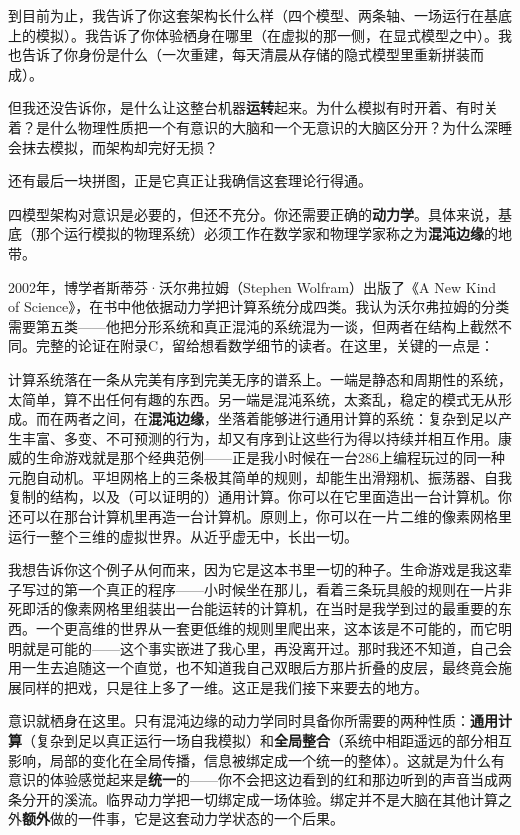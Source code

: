 \documentclass[11pt, twoside, openright]{book}
\begin{document}
到目前为止，我告诉了你这套架构长什么样（四个模型、两条轴、一场运行在基底上的模拟）。我告诉了你体验栖身在哪里（在虚拟的那一侧，在显式模型之中）。我也告诉了你身份是什么（一次重建，每天清晨从存储的隐式模型里重新拼装而成）。

但我还没告诉你，是什么让这整台机器\textbf{运转}起来。为什么模拟有时开着、有时关着？是什么物理性质把一个有意识的大脑和一个无意识的大脑区分开？为什么深睡会抹去模拟，而架构却完好无损？

还有最后一块拼图，正是它真正让我确信这套理论行得通。

四模型架构对意识是必要的，但还不充分。你还需要正确的\textbf{动力学}。具体来说，基底（那个运行模拟的物理系统）必须工作在数学家和物理学家称之为\textbf{混沌边缘}的地带。

2002年，博学者斯蒂芬·沃尔弗拉姆（Stephen Wolfram）出版了《A New Kind of Science》，在书中他依据动力学把计算系统分成四类。我认为沃尔弗拉姆的分类需要第五类------他把分形系统和真正混沌的系统混为一谈，但两者在结构上截然不同。完整的论证在附录C，留给想看数学细节的读者。在这里，关键的一点是：

计算系统落在一条从完美有序到完美无序的谱系上。一端是静态和周期性的系统，太简单，算不出任何有趣的东西。另一端是混沌系统，太紊乱，稳定的模式无从形成。而在两者之间，在\textbf{混沌边缘}，坐落着能够进行通用计算的系统：复杂到足以产生丰富、多变、不可预测的行为，却又有序到让这些行为得以持续并相互作用。康威的生命游戏就是那个经典范例------正是我小时候在一台286上编程玩过的同一种元胞自动机。平坦网格上的三条极其简单的规则，却能生出滑翔机、振荡器、自我复制的结构，以及（可以证明的）通用计算。你可以在它里面造出一台计算机。你还可以在那台计算机里再造一台计算机。原则上，你可以在一片二维的像素网格里运行一整个三维的虚拟世界。从近乎虚无中，长出一切。

我想告诉你这个例子从何而来，因为它是这本书里一切的种子。生命游戏是我这辈子写过的第一个真正的程序------小时候坐在那儿，看着三条玩具般的规则在一片非死即活的像素网格里组装出一台能运转的计算机，在当时是我学到过的最重要的东西。一个更高维的世界从一套更低维的规则里爬出来，这本该是不可能的，而它明明就是可能的------这个事实嵌进了我心里，再没离开过。那时我还不知道，自己会用一生去追随这一个直觉，也不知道我自己双眼后方那片折叠的皮层，最终竟会施展同样的把戏，只是往上多了一维。这正是我们接下来要去的地方。

意识就栖身在这里。只有混沌边缘的动力学同时具备你所需要的两种性质：\textbf{通用计算}（复杂到足以真正运行一场自我模拟）和\textbf{全局整合}（系统中相距遥远的部分相互影响，局部的变化在全局传播，信息被绑定成一个统一的整体）。这就是为什么有意识的体验感觉起来是\textbf{统一}的------你不会把这边看到的红和那边听到的声音当成两条分开的溪流。临界动力学把一切绑定成一场体验。绑定并不是大脑在其他计算之外\textbf{额外}做的一件事，它是这套动力学状态的一个后果。
\end{document}
